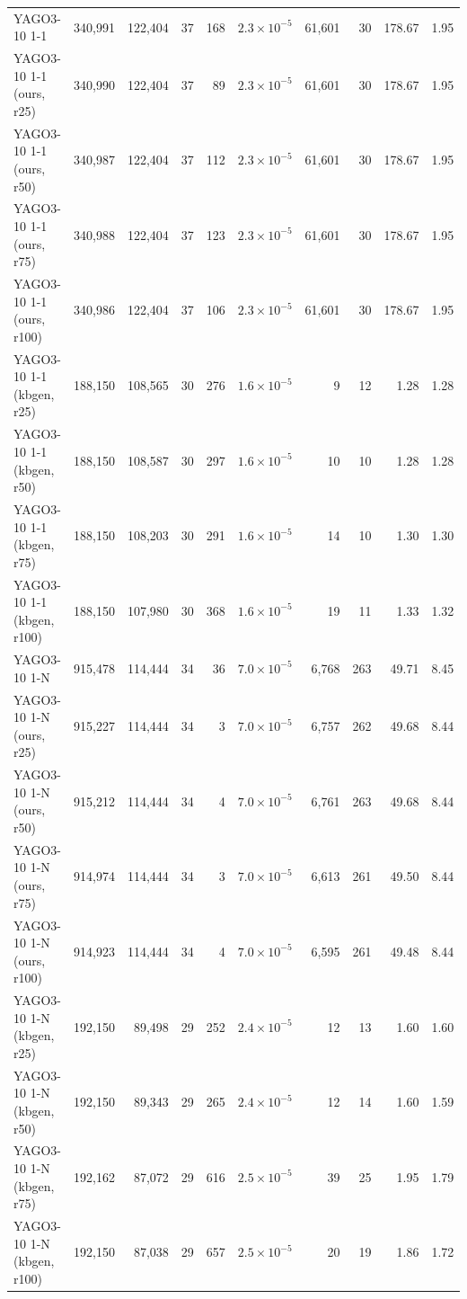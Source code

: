 \begin{tabular}{lrrrrrrrrr}
\midrule
YAGO3-10 1-1 & 340{,}991 & 122{,}404 & 37 & 168 & $2.3\times10^{-5}$ & 61{,}601 & 30 & 178.67 & 1.95 \\
YAGO3-10 1-1 (ours, r25) & 340{,}990 & 122{,}404 & 37 & 89 & $2.3\times10^{-5}$ & 61{,}601 & 30 & 178.67 & 1.95 \\
YAGO3-10 1-1 (ours, r50) & 340{,}987 & 122{,}404 & 37 & 112 & $2.3\times10^{-5}$ & 61{,}601 & 30 & 178.67 & 1.95 \\
YAGO3-10 1-1 (ours, r75) & 340{,}988 & 122{,}404 & 37 & 123 & $2.3\times10^{-5}$ & 61{,}601 & 30 & 178.67 & 1.95 \\
YAGO3-10 1-1 (ours, r100) & 340{,}986 & 122{,}404 & 37 & 106 & $2.3\times10^{-5}$ & 61{,}601 & 30 & 178.67 & 1.95 \\
YAGO3-10 1-1 (kbgen, r25) & 188{,}150 & 108{,}565 & 30 & 276 & $1.6\times10^{-5}$ & 9 & 12 & 1.28 & 1.28 \\
YAGO3-10 1-1 (kbgen, r50) & 188{,}150 & 108{,}587 & 30 & 297 & $1.6\times10^{-5}$ & 10 & 10 & 1.28 & 1.28 \\
YAGO3-10 1-1 (kbgen, r75) & 188{,}150 & 108{,}203 & 30 & 291 & $1.6\times10^{-5}$ & 14 & 10 & 1.30 & 1.30 \\
YAGO3-10 1-1 (kbgen, r100) & 188{,}150 & 107{,}980 & 30 & 368 & $1.6\times10^{-5}$ & 19 & 11 & 1.33 & 1.32 \\
\midrule
YAGO3-10 1-N & 915{,}478 & 114{,}444 & 34 & 36 & $7.0\times10^{-5}$ & 6{,}768 & 263 & 49.71 & 8.45 \\
YAGO3-10 1-N (ours, r25) & 915{,}227 & 114{,}444 & 34 & 3 & $7.0\times10^{-5}$ & 6{,}757 & 262 & 49.68 & 8.44 \\
YAGO3-10 1-N (ours, r50) & 915{,}212 & 114{,}444 & 34 & 4 & $7.0\times10^{-5}$ & 6{,}761 & 263 & 49.68 & 8.44 \\
YAGO3-10 1-N (ours, r75) & 914{,}974 & 114{,}444 & 34 & 3 & $7.0\times10^{-5}$ & 6{,}613 & 261 & 49.50 & 8.44 \\
YAGO3-10 1-N (ours, r100) & 914{,}923 & 114{,}444 & 34 & 4 & $7.0\times10^{-5}$ & 6{,}595 & 261 & 49.48 & 8.44 \\
YAGO3-10 1-N (kbgen, r25) & 192{,}150 & 89{,}498 & 29 & 252 & $2.4\times10^{-5}$ & 12 & 13 & 1.60 & 1.60 \\
YAGO3-10 1-N (kbgen, r50) & 192{,}150 & 89{,}343 & 29 & 265 & $2.4\times10^{-5}$ & 12 & 14 & 1.60 & 1.59 \\
YAGO3-10 1-N (kbgen, r75) & 192{,}162 & 87{,}072 & 29 & 616 & $2.5\times10^{-5}$ & 39 & 25 & 1.95 & 1.79 \\
YAGO3-10 1-N (kbgen, r100) & 192{,}150 & 87{,}038 & 29 & 657 & $2.5\times10^{-5}$ & 20 & 19 & 1.86 & 1.72 \\

\end{tabular}
